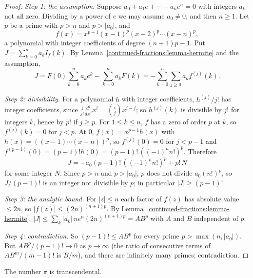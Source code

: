 \begin{proof}
\emph{Step 1: the assumption.} Suppose $a_0 + a_1e + \cdots + a_ne^n = 0$ with integers $a_k$ not all zero. Dividing by a power of $e$ we may assume $a_0 \neq 0$, and then $n \geq 1$. Let $p$ be a prime
with $p > n$ and $p > |a_0|$, and
\[
f(x) = x^{p-1}(x - 1)^p(x - 2)^p\cdots(x - n)^p,
\]
a polynomial with integer coefficients of degree $(n + 1)p - 1$. Put $J = \sum_{k=0}^na_kI_f(k)$. By Lemma~\ref{continued-fractions:lemma-hermite} and the assumption,
\[
J = F(0)\sum_{k=0}^na_ke^k - \sum_{k=0}^na_kF(k) = -\sum_{k=0}^n\sum_{j \geq 0}a_kf^{(j)}(k).
\]

\emph{Step 2: divisibility.} For a polynomial $h$ with integer coefficients, $h^{(j)}/j!$ has integer coefficients, since $\frac{1}{j!}\frac{d^j}{dx^j}x^i = \binom ij x^{i-j}$; so $h^{(j)}(k)$ is divisible by
$j!$ for integers $k$, hence by $p!$ if $j \geq p$. For $1 \leq k \leq n$, $f$ has a zero of order $p$ at $k$, so $f^{(j)}(k) = 0$ for $j < p$. At $0$, $f(x) = x^{p-1}h(x)$ with
$h(x) = ((x - 1)\cdots(x - n))^p$, so $f^{(j)}(0) = 0$ for $j < p - 1$ and $f^{(p-1)}(0) = (p - 1)!h(0) = (p - 1)!\,((-1)^nn!)^p$. Therefore
\[
J = -a_0(p - 1)!\,((-1)^nn!)^p + p!\,N
\]
for some integer $N$. Since $p > n$ and $p > |a_0|$, $p$ does not divide $a_0(n!)^p$, so $J/(p - 1)!$ is an integer not divisible by $p$; in particular $|J| \geq (p - 1)!$.

\emph{Step 3: the analytic bound.} For $|z| \leq n$ each factor of $f(z)$ has absolute value $\leq 2n$, so $|f(z)| \leq (2n)^{(n+1)p}$. By Lemma~\ref{continued-fractions:lemma-hermite},
$|J| \leq \sum_k|a_k|\,ne^n(2n)^{(n+1)p} = AB^p$ with $A$ and $B$ independent of $p$.

\emph{Step 4: contradiction.} So $(p - 1)! \leq AB^p$ for every prime $p > \max(n, |a_0|)$. But $AB^p/(p - 1)! \to 0$ as $p \to \infty$ (the ratio of consecutive terms of $AB^m/(m - 1)!$ is $B/m$), and there
are infinitely many primes; contradiction.
\end{proof}

\begin{theorem}[Lindemann, 1882]\label{continued-fractions:theorem-pi-transcendental}
The number $\pi$ is transcendental.
\end{theorem}

